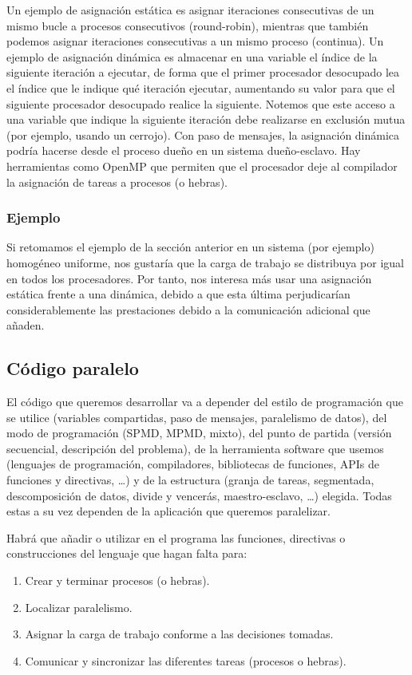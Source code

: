 Un ejemplo de asignación estática es asignar iteraciones consecutivas de un mismo bucle a procesos consecutivos (round-robin), mientras que también podemos asignar iteraciones consecutivas a un mismo proceso (continua). Un ejemplo de asignación dinámica es almacenar en una variable el índice de la siguiente iteración a ejecutar, de forma que el primer procesador desocupado lea el índice que le indique qué iteración ejecutar, aumentando su valor para que el siguiente procesador desocupado realice la siguiente. Notemos que este acceso a una variable que indique la siguiente iteración debe realizarse en exclusión mutua (por ejemplo, usando un cerrojo). Con paso de mensajes, la asignación dinámica podría hacerse desde el proceso dueño en un sistema dueño-esclavo. Hay herramientas como OpenMP que permiten que el procesador deje al compilador la asignación de tareas a procesos (o hebras).

\subsubsection{Ejemplo}
Si retomamos el ejemplo de la sección anterior en un sistema (por ejemplo) homogéneo uniforme, nos gustaría que la carga de trabajo se distribuya por igual en todos los procesadores. Por tanto, nos interesa más usar una asignación estática frente a una dinámica, debido a que esta última perjudicarían considerablemente las prestaciones debido a la comunicación adicional que añaden.

\subsection{Código paralelo}
El código que queremos desarrollar va a depender del estilo de programación que se utilice (variables compartidas, paso de mensajes, paralelismo de datos), del modo de programación (SPMD, MPMD, mixto), del punto de partida (versión secuencial, descripción del problema), de la herramienta software que usemos (lenguajes de programación, compiladores, bibliotecas de funciones, APIs de funciones y directivas, \ldots) y de la estructura (granja de tareas, segmentada, descomposición de datos, divide y vencerás, maestro-esclavo, \ldots) elegida. Todas estas a su vez dependen de la aplicación que queremos paralelizar.

Habrá que añadir o utilizar en el programa las funciones, directivas o construcciones del lenguaje que hagan falta para:
\begin{enumerate}
    \item Crear y terminar procesos (o hebras).
    \item Localizar paralelismo.
    \item Asignar la carga de trabajo conforme a las decisiones tomadas.
    \item Comunicar y sincronizar las diferentes tareas (procesos o hebras).
\end{enumerate}

